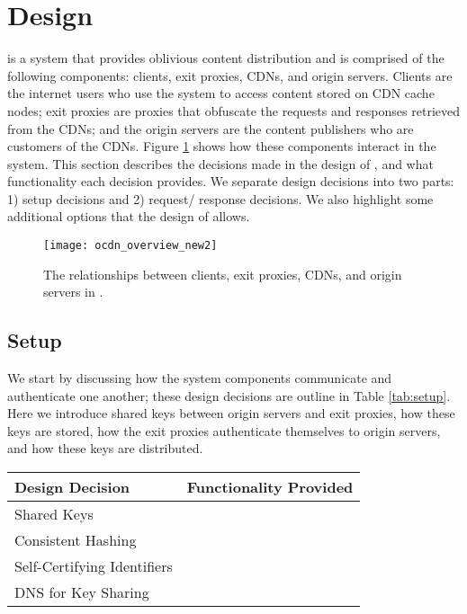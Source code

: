 \section{Design}
\label{sec:design}
\system{} is a system that provides oblivious content distribution and is 
comprised of the following components: clients, exit proxies, CDNs, and origin 
servers.  Clients are the internet users who use the system to access content 
stored on CDN cache nodes; exit proxies are proxies that obfuscate the requests 
and responses retrieved from the CDNs; and the origin servers are the content 
publishers who are customers of the CDNs.  Figure \ref{fig:ocd_overview} shows how
these components interact in the system.  This section describes the decisions 
made in the design of \system{}, and what functionality each decision provides.  
We separate design decisions into two parts: 1) setup decisions and 2) request/
response decisions.  We also highlight some additional options that the design of 
\system{} allows.

\begin{figure}[t!]
\centering
\texttt{[image: ocdn\_overview\_new2]}
\caption{The relationships between clients, exit proxies, CDNs, and origin servers in 
\system{}.}
\label{fig:ocd_overview}
\end{figure}

\subsection{\system{} Setup}
We start by discussing how the system components communicate and authenticate 
one another; these design decisions are outline in Table \ref{tab:setup}.  Here
we introduce shared keys between origin servers and exit proxies, how these keys are 
stored, how the exit proxies authenticate themselves to origin servers, and how these 
keys are distributed.

\begin{table*}[t!]
\centering
\begin{tabular}{| l | l |} 
\hline
 Design Decision & Functionality Provided \\
\hline \hline
 Shared Keys & {} \\
\hline
 Consistent Hashing & {} \\
\hline
 Self-Certifying Identifiers & {} \\
\hline
 DNS for Key Sharing & {} \\
\hline
\end{tabular}
\caption{The design decisions associated with the setup and logistical aspects of \system{}, and what these decisions provide.}
\label{tab:setup}
\end{table*}

